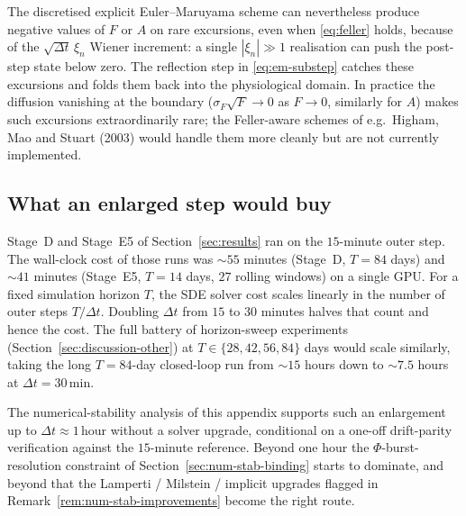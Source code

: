The discretised explicit Euler--Maruyama scheme can nevertheless
produce negative values of $F$ or $A$ on rare excursions, even when
\eqref{eq:feller} holds, because of the
$\sqrt{\Delta t}\,\xi_n$ Wiener increment: a single
$|\xi_n| \gg 1$ realisation can push the post-step state below
zero. The reflection step in \eqref{eq:em-substep} catches these
excursions and folds them back into the physiological domain. In
practice the diffusion vanishing at the boundary
($\sigma_F\sqrt F \to 0$ as $F \to 0$, similarly for $A$) makes
such excursions extraordinarily rare; the Feller-aware schemes of
e.g.\ Higham, Mao and Stuart (2003) would handle them more cleanly
but are not currently implemented.

\subsection{What an enlarged step would buy}\label{app:num-stab-cost}

Stage~D and Stage~E5 of Section~\ref{sec:results} ran on the
$15$-minute outer step. The wall-clock cost of those runs was
$\sim\!55$ minutes (Stage~D, $T = 84$ days) and $\sim\!41$ minutes
(Stage~E5, $T = 14$ days, $27$ rolling windows) on a single GPU.
For a fixed simulation horizon $T$, the SDE solver cost scales
linearly in the number of outer steps $T/\Delta t$. Doubling
$\Delta t$ from $15$ to $30$ minutes halves that count and hence
the cost. The full battery of horizon-sweep experiments
(Section~\ref{sec:discussion-other}) at $T \in \{28,42,56,84\}$
days would scale similarly, taking the long $T = 84$-day
closed-loop run from $\sim\!15$ hours down to $\sim\!7.5$ hours
at $\Delta t = 30\,\mathrm{min}$.

The numerical-stability analysis of this appendix supports such an
enlargement up to $\Delta t \approx 1\,\mathrm{hour}$ without a
solver upgrade, conditional on a one-off drift-parity verification
against the $15$-minute reference. Beyond one hour the
$\Phi$-burst-resolution constraint of
Section~\ref{sec:num-stab-binding} starts to dominate, and beyond
that the Lamperti / Milstein / implicit upgrades flagged in
Remark~\ref{rem:num-stab-improvements} become the right route.
